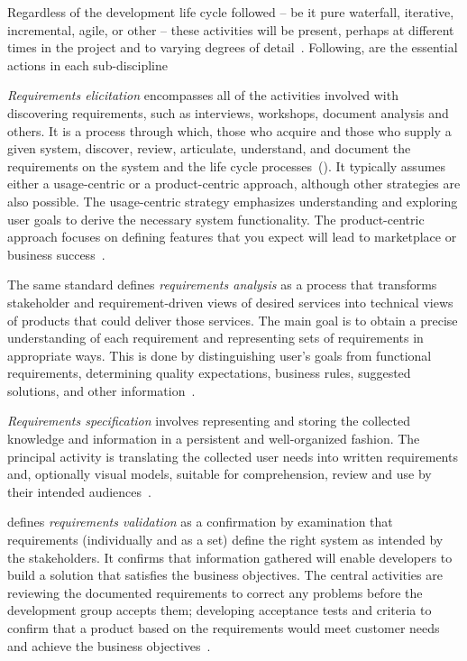 \documentclass[dissertation,final]{softeng}
\begin{document}
Regardless of the development life cycle followed -- be it pure waterfall, iterative, incremental, agile, or other -- these activities will be present, perhaps at different times in the project and to varying degrees of detail~\citep{Wiegers2013}. Following, are the essential actions in each sub-discipline

\emph{Requirements elicitation} encompasses all of the activities involved with discovering requirements, such as interviews, workshops, document analysis and others. It is a process through which, those who acquire and those who supply a given system, discover, review, articulate, understand, and document the requirements on the system and the life cycle processes~(). It typically assumes either a usage-centric or a product-centric approach, although other strategies are also possible. The usage-centric strategy emphasizes understanding and exploring user goals to derive the necessary system functionality. The product-centric approach focuses on defining features that you expect will lead to marketplace or business success~\citep{Wiegers2013}.

The same standard defines \emph{requirements analysis} as a process that transforms stakeholder and requirement-driven views of desired services into technical views of products that could deliver those services. The main goal is to obtain a precise understanding of each requirement and representing sets of requirements in appropriate ways. This is done by distinguishing user's goals from functional requirements, determining quality expectations, business rules, suggested solutions, and other information~\citep{Wiegers2013}.

\emph{Requirements specification} involves representing and storing the collected knowledge and information in a persistent and well-organized fashion. The principal activity is translating the collected user needs into written requirements and, optionally visual models, suitable for comprehension, review and use by their intended audiences~\citep{Wiegers2013}.

 defines \emph{requirements validation} as a confirmation by examination that requirements (individually and as a set) define the right system as intended by the stakeholders. It confirms that information gathered will enable developers to build a solution that satisfies the business objectives. The central activities are reviewing the documented requirements to correct any problems before the development group accepts them; developing acceptance tests and criteria to confirm that a product based on the requirements would meet customer needs and achieve the business objectives~\citep{Wiegers2013}.
\end{document}
